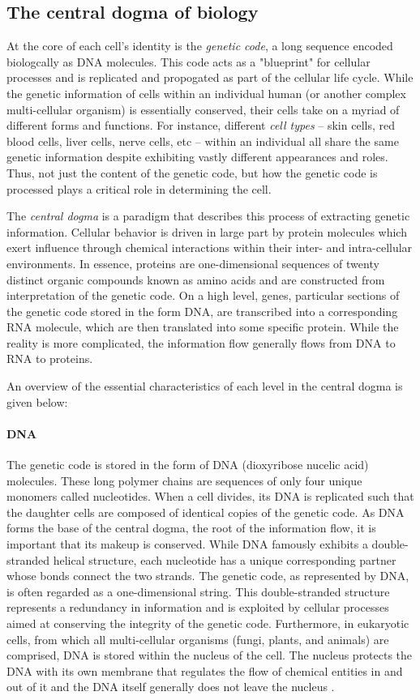 \subsection{The central dogma of biology}
At the core of each cell's identity is the \emph{genetic code}, a long sequence encoded biologcally as DNA molecules.
This code acts as a "blueprint" for cellular processes and
is replicated and propogated as part of the cellular life cycle.
While the genetic information of cells within an individual human (or another complex multi-cellular organism) is essentially conserved, their cells take on a myriad of different forms and functions.
For instance, different \emph{cell types} -- skin cells, red blood cells, liver cells, nerve cells, etc -- within an individual all share the same genetic information despite exhibiting vastly different appearances and roles.
Thus, not just the content of the genetic code, but how the genetic code is processed plays a critical role in determining the cell.

The \emph{central dogma} is a paradigm that describes this process of extracting genetic information.
Cellular behavior is driven in large part by protein molecules which exert influence through chemical interactions within their inter- and intra-cellular environments.
In essence, proteins are one-dimensional sequences of twenty distinct organic compounds known as amino acids and are constructed from interpretation of the genetic code.
On a high level, genes, particular sections of the genetic code stored in the form DNA, are transcribed into a corresponding RNA molecule, which are then translated into some specific protein.
While the reality is more complicated, the information flow generally flows from DNA to RNA to proteins.

An overview of the essential characteristics of each level in the central dogma is given below:

\paragraph{DNA} The genetic code is stored in the form of DNA (dioxyribose nucelic acid) molecules.
These long polymer chains are sequences of only four unique monomers called nucleotides.
When a cell divides, its DNA is replicated such that the daughter cells are composed of identical copies of the genetic code.
As DNA forms the base of the central dogma, the root of the information flow, it is important that its makeup is conserved.
While DNA famously exhibits a double-stranded helical structure,
each nucleotide has a unique corresponding partner whose bonds connect the two strands.
The genetic code, as represented by DNA, is often regarded as a one-dimensional string.
This double-stranded structure represents a redundancy in information and is exploited by cellular processes aimed at conserving the integrity of the genetic code.
Furthermore, in eukaryotic cells, from which all multi-cellular organisms (fungi, plants, and animals) are comprised, DNA is stored within the nucleus of the cell.
The nucleus protects the DNA with its own membrane that regulates the flow of chemical entities in and out of it and the DNA itself generally does not leave the nucleus \cite{milo2015}.

